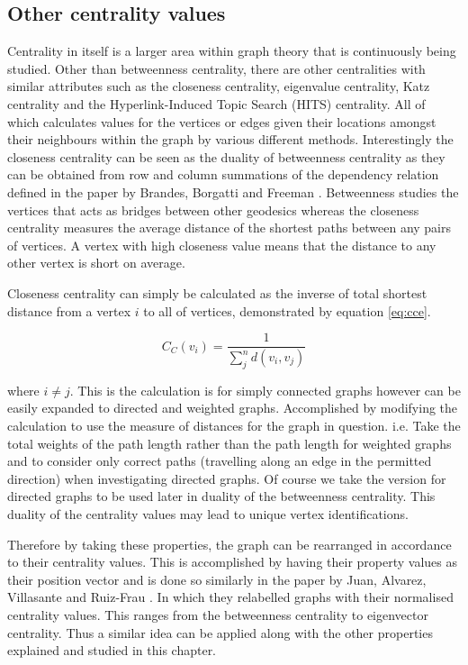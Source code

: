 \subsection{Other centrality values}
Centrality in itself is a larger area within graph theory that is continuously being studied. Other than betweenness centrality, there are other centralities with similar attributes such as the closeness centrality, eigenvalue centrality, Katz centrality \cite{katz1953new} and the Hyperlink-Induced Topic Search (HITS) centrality. All of which calculates values for the vertices or edges given their locations amongst their neighbours within the graph by various different methods. Interestingly the closeness centrality can be seen as the duality of betweenness centrality as they can be obtained from row and column summations of the dependency relation defined in the paper by Brandes, Borgatti and Freeman \cite{brandes2016maintaining}.
Betweenness studies the vertices that acts as bridges between other geodesics whereas the closeness centrality measures the average distance of the shortest paths between any pairs of vertices. A vertex with high closeness value means that the distance to any other vertex is short on average. 

Closeness centrality \cite{brandes2007centrality} can simply be calculated as the inverse of total shortest distance from a vertex $i$ to all of vertices, demonstrated by equation \ref{eq:cce}.

\begin{equation}\label{eq:cce}
C_C(v_i) = \frac{1}{\sum_{j}^nd(v_i, v_j)}
\end{equation}

where $i \ne j$. This is the calculation is for simply connected graphs however can be easily expanded to directed and weighted graphs. Accomplished by modifying the calculation to use the measure of distances for the graph in question. i.e. Take the total weights of the path length rather than the path length for weighted graphs and to consider only correct paths (travelling along an edge in the permitted direction) when investigating directed graphs. Of course we take the version for directed graphs to be used later in duality of the betweenness centrality. This duality of the centrality values may lead to unique vertex identifications.
\newline

Therefore by taking these properties, the graph can be rearranged in accordance to their centrality values. This is accomplished by having their property values as their position vector and is done so similarly in the paper by Juan, Alvarez, Villasante and Ruiz-Frau \cite{de2021graph}. In which they relabelled graphs with their normalised centrality values. This ranges from the betweenness centrality to eigenvector centrality. Thus a similar idea can be applied along with the other properties explained and studied in this chapter.

